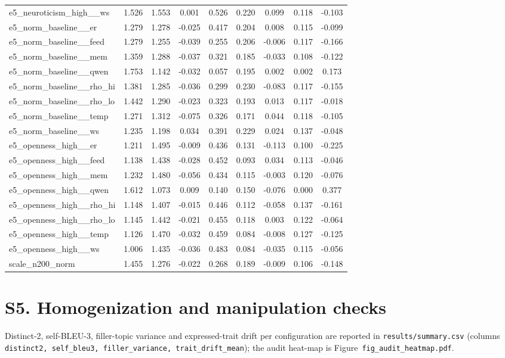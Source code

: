 \documentclass[11pt]{article}
\begin{document}
\begin{longtable}{lcccccccc}
e5\_neuroticism\_high\_\_ws & 1.526 & 1.553 & 0.001 & 0.526 & 0.220 & 0.099 & 0.118 & -0.103 \\
e5\_norm\_baseline\_\_er & 1.279 & 1.278 & -0.025 & 0.417 & 0.204 & 0.008 & 0.115 & -0.099 \\
e5\_norm\_baseline\_\_feed & 1.279 & 1.255 & -0.039 & 0.255 & 0.206 & -0.006 & 0.117 & -0.166 \\
e5\_norm\_baseline\_\_mem & 1.359 & 1.288 & -0.037 & 0.321 & 0.185 & -0.033 & 0.108 & -0.122 \\
e5\_norm\_baseline\_\_qwen & 1.753 & 1.142 & -0.032 & 0.057 & 0.195 & 0.002 & 0.002 & 0.173 \\
e5\_norm\_baseline\_\_rho\_hi & 1.381 & 1.285 & -0.036 & 0.299 & 0.230 & -0.083 & 0.117 & -0.155 \\
e5\_norm\_baseline\_\_rho\_lo & 1.442 & 1.290 & -0.023 & 0.323 & 0.193 & 0.013 & 0.117 & -0.018 \\
e5\_norm\_baseline\_\_temp & 1.271 & 1.312 & -0.075 & 0.326 & 0.171 & 0.044 & 0.118 & -0.105 \\
e5\_norm\_baseline\_\_ws & 1.235 & 1.198 & 0.034 & 0.391 & 0.229 & 0.024 & 0.137 & -0.048 \\
e5\_openness\_high\_\_er & 1.211 & 1.495 & -0.009 & 0.436 & 0.131 & -0.113 & 0.100 & -0.225 \\
e5\_openness\_high\_\_feed & 1.138 & 1.438 & -0.028 & 0.452 & 0.093 & 0.034 & 0.113 & -0.046 \\
e5\_openness\_high\_\_mem & 1.232 & 1.480 & -0.056 & 0.434 & 0.115 & -0.003 & 0.120 & -0.076 \\
e5\_openness\_high\_\_qwen & 1.612 & 1.073 & 0.009 & 0.140 & 0.150 & -0.076 & 0.000 & 0.377 \\
e5\_openness\_high\_\_rho\_hi & 1.148 & 1.407 & -0.015 & 0.446 & 0.112 & -0.058 & 0.137 & -0.161 \\
e5\_openness\_high\_\_rho\_lo & 1.145 & 1.442 & -0.021 & 0.455 & 0.118 & 0.003 & 0.122 & -0.064 \\
e5\_openness\_high\_\_temp & 1.126 & 1.470 & -0.032 & 0.459 & 0.084 & -0.008 & 0.127 & -0.125 \\
e5\_openness\_high\_\_ws & 1.006 & 1.435 & -0.036 & 0.483 & 0.084 & -0.035 & 0.115 & -0.056 \\
scale\_n200\_norm & 1.455 & 1.276 & -0.022 & 0.268 & 0.189 & -0.009 & 0.106 & -0.148 \\
\bottomrule
\end{longtable}

\section{S5. Homogenization and manipulation checks}
Distinct-2, self-BLEU-3, filler-topic variance and expressed-trait drift per configuration are
reported in \texttt{results/summary.csv} (columns \texttt{distinct2, self\_bleu3,
filler\_variance, trait\_drift\_mean}); the audit heat-map is Figure~\texttt{fig\_audit\_heatmap.pdf}.
\end{document}
